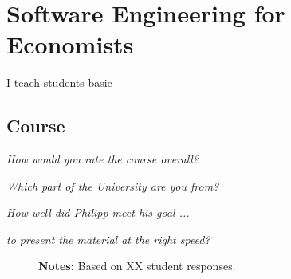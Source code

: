 \section{Software Engineering for Economists}

I teach students basic 

\subsection{Course}

\begin{boenumerate}
\item \textit{How would you rate the course overall?}
\begin{figure}[h!]\centering
{}\hspace{0.75cm}
\end{figure}
\item \textit{Which part of the University are you from?}

\begin{figure}[h!]\centering
{}\hspace{0.75cm}
\end{figure}
\item \textit{How well did Philipp meet his goal ...}
\begin{itemize}
\item \textit{to present the material at the right speed?}

\begin{figure}[h!]\centering
{}\hspace{0.75cm}
\begin{center}
\begin{minipage}[t]{0.85\columnwidth}\vspace{-0.25cm} 
\item\scriptsize{\textbf{Notes:} Based on XX student responses. }
\end{minipage}
\end{center}
\end{figure}
\end{itemize}\end{boenumerate}

